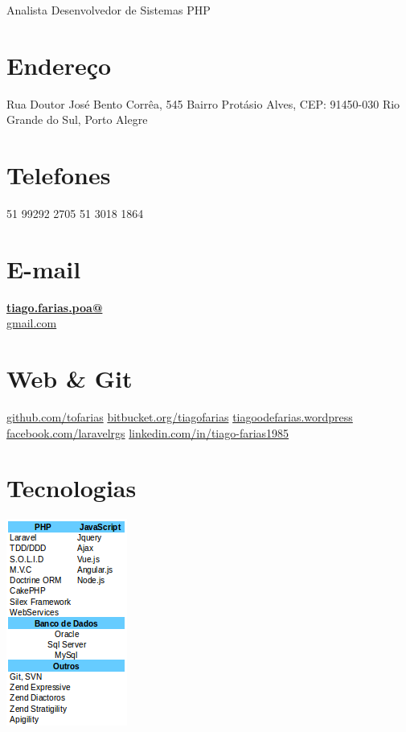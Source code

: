 \documentclass[]{friggeri-cv}
\begin{document}
      {Analista Desenvolvedor de Sistemas PHP}
      

\begin{aside}
  \section{Endereço}  	
    Rua Doutor José Bento Corrêa, 545
    Bairro Protásio Alves,
    CEP: 91450-030
    Rio Grande do Sul, Porto Alegre
    ~
  \section{Telefones}
    51 99292 2705
    51 3018 1864
    ~
  \section{E-mail}
    \href{mailto:tiago.farias.poa@gmail.com}{\textbf{tiago.farias.poa@}\\gmail.com}
    ~
  \section{Web \& Git}
    \href{https://github.com/tofarias}{github.com/tofarias}
    \href{https://bitbucket.org/tiagofarias}{bitbucket.org/tiagofarias}
    \href{https://tiagoodefarias.wordpress.com/}{tiagoodefarias.wordpress}
    \href{https://www.facebook.com/groups/laravelrgs}{facebook.com/laravelrgs}
    \href{https://www.linkedin.com/in/tiago-farias1985}{linkedin.com/in/tiago-farias1985}
    ~
  \section{Tecnologias}
    \includegraphics[scale=0.62]{img/programacao.png}
    ~

\end{aside}
\end{document}
